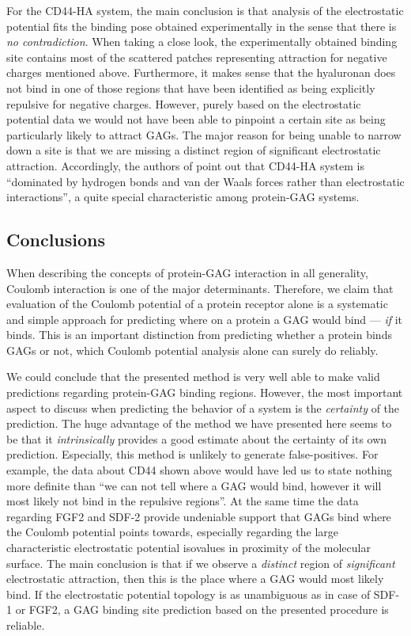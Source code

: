 For the CD44-HA system, the main conclusion is that analysis of the
electrostatic potential fits the binding pose obtained experimentally in the
sense that there is \textit{no contradiction}. When taking a close look, the
experimentally obtained binding site contains most of the scattered patches
representing attraction for negative charges mentioned above. Furthermore, it
makes sense that the hyaluronan does not bind in one of those regions that have
been identified as being explicitly repulsive for negative charges. However,
purely based on the electrostatic potential data we would not have been able to
pinpoint a certain site as being particularly likely to attract GAGs. The major
reason for being unable to narrow down a site is that we are missing a distinct
region of significant electrostatic attraction. Accordingly, the authors of
\cite{cd44_hya_2007} point out that CD44-HA system is  \enquote{dominated by
hydrogen bonds and van der Waals forces rather than electrostatic interactions},
a quite special characteristic among protein-GAG systems.



\subsection{Conclusions}

When describing the concepts of protein-GAG interaction in all generality,
Coulomb interaction is one of the major determinants. Therefore, we claim that
evaluation of the Coulomb potential of a protein receptor alone is a systematic
and simple approach for predicting where on a protein a GAG would bind ---
\textit{if} it binds. This is an important distinction from predicting whether a
protein binds GAGs or not, which Coulomb potential analysis alone can surely
 do reliably.

We could conclude that the presented method is very well able to make valid
predictions regarding protein-GAG binding regions. However, the most important
aspect to discuss when predicting the behavior of a system is the
\textit{certainty} of the prediction. The huge advantage of the method we have
presented here seems to be that it \textit{intrinsically} provides a good
estimate about the certainty of its own prediction. Especially, this method is
unlikely to generate false-positives. For example, the data about CD44 shown
above would have led us to state nothing more definite than \enquote{we can not
tell where a GAG would bind, however it will most likely not bind in the
repulsive regions}. At the same time the data regarding FGF2 and SDF-2 provide
undeniable support that GAGs bind where the Coulomb potential points towards,
especially regarding the large characteristic electrostatic potential isovalues
in proximity of the molecular surface. The main conclusion is that if we observe
a \textit{distinct} region of \textit{significant} electrostatic attraction,
then this is the place where a GAG would most likely bind. If the electrostatic
potential topology is as unambiguous as in case of SDF-1 or FGF2, a GAG binding
site prediction based on the presented procedure is reliable.

